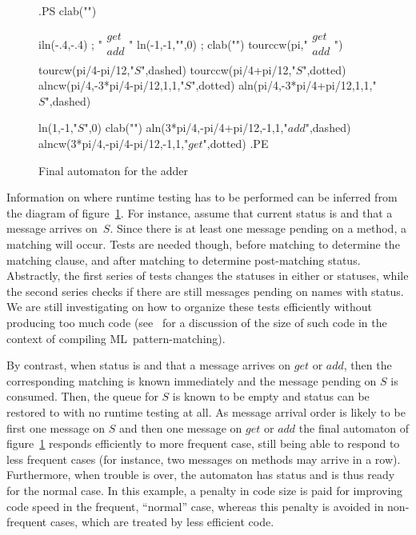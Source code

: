 \begin{figure}[th]
\begin{toimage}
.PS
clab("")

{{iln(-.4,-.4) ; "$\begin{array}{l}get\\add\\[.5em]\end{array}$"}
 ln(-1,-1,"",0) ; clab("")
 tourccw(pi,"$\begin{array}{l}get\\add\\[.5em]\end{array}$")
 tourcw(pi/4-pi/12,"$S$",dashed)
 tourccw(pi/4+pi/12,"$S$",dotted)
 {alncw(pi/4,-3*pi/4-pi/12,1,1,"$S$",dotted)}
 {aln(pi/4,-3*pi/4+pi/12,1,1,"$S$",dashed)}
}

{ln(1,-1,"$S$",0)
   clab("")
   {aln(3*pi/4,-pi/4+pi/12,-1,1,"$add$",dashed)}
   {alncw(3*pi/4,-pi/4-pi/12,-1,1,"$get$",dotted)}
}
.PE
\end{toimage}
\showgraph
\caption{\label{adder2} Final automaton for the adder}
\end{figure}

Information on where runtime testing has to be performed can be
inferred from the diagram of figure~\ref{adder2}.  For instance,
assume that current status is  and that a message arrives
on~$S$.  Since there is at least one message pending on a method, a
matching will occur.  Tests are needed though, before matching to
determine the matching clause, and after matching to determine
post-matching status.  Abstractly, the first series of tests changes
the   statuses in either  or  statuses,
while the second series checks if there are still messages pending on
names with  status.  We are still investigating on how to
organize these tests efficiently without producing too much code
(see~\cite{Augustsson85,Maranget92} for a discussion of the size of
such code in the context of compiling ML~pattern-matching).

By contrast, when status is  and that a message arrives on
$get$ or $add$, then the corresponding matching is known immediately
and the message pending on $S$ is consumed. Then, the queue for $S$ is
known to be empty and status can be restored to  with no
runtime testing at all.  As message arrival order is likely to be
first one message on $S$ and then one message on $get$ or $add$ the
final automaton of figure~\ref{adder2} responds efficiently to more
frequent case, still being able to respond to less frequent cases (for
instance, two messages on methods may arrive in a row).  Furthermore,
when trouble is over, the automaton has status  and is
thus ready for the normal case. In this example, a penalty in code
size is paid for improving code speed in the frequent, ``normal''
case, whereas this penalty is avoided in non-frequent cases, which are
treated by less efficient code.

